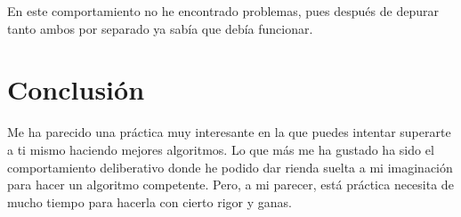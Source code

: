 \documentclass[a4paper,11pt]{article}
\begin{document}
En este comportamiento no he encontrado problemas, pues después de depurar tanto ambos por separado ya sabía que debía funcionar.


\section{Conclusión}

Me ha parecido una práctica muy interesante en la que puedes intentar superarte a ti mismo haciendo mejores algoritmos. Lo que más me ha gustado ha sido el comportamiento deliberativo donde he podido dar rienda suelta a mi imaginación para hacer un algoritmo competente. Pero, a mi parecer, está práctica necesita de mucho tiempo para hacerla con cierto rigor y ganas.
\end{document}
